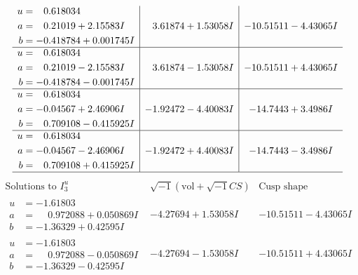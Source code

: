 \documentclass[1p]{elsarticle_modified}
\theoremstyle{definition}
\newcommand{\I}{\sqrt{-1}}
\begin{document}
$$\begin{array}{c|c|c}
\begin{aligned}
u &= \phantom{-}0.618034\phantom{ +0.000000I} \\
a &= \phantom{-}0.21019 + 2.15583 I \\
b &= -0.418784 + 0.001745 I\end{aligned}
 & \phantom{-}3.61874 + 1.53058 I & -10.51511 - 4.43065 I \\ \hline\begin{aligned}
u &= \phantom{-}0.618034\phantom{ +0.000000I} \\
a &= \phantom{-}0.21019 - 2.15583 I \\
b &= -0.418784 - 0.001745 I\end{aligned}
 & \phantom{-}3.61874 - 1.53058 I & -10.51511 + 4.43065 I \\ \hline\begin{aligned}
u &= \phantom{-}0.618034\phantom{ +0.000000I} \\
a &= -0.04567 + 2.46906 I \\
b &= \phantom{-}0.709108 - 0.415925 I\end{aligned}
 & -1.92472 - 4.40083 I & -14.7443 + 3.4986 I \\ \hline\begin{aligned}
u &= \phantom{-}0.618034\phantom{ +0.000000I} \\
a &= -0.04567 - 2.46906 I \\
b &= \phantom{-}0.709108 + 0.415925 I\end{aligned}
 & -1.92472 + 4.40083 I & -14.7443 - 3.4986 I\\
 \hline 
 \end{array}$$\newpage$$\begin{array}{c|c|c}  
\text{Solutions to }I^u_{3}& \I (\text{vol} + \sqrt{-1}CS) & \text{Cusp shape}\\
 \hline 
\begin{aligned}
u &= -1.61803\phantom{ +0.000000I} \\
a &= \phantom{-}0.972088 + 0.050869 I \\
b &= -1.36329 + 0.42595 I\end{aligned}
 & -4.27694 + 1.53058 I & -10.51511 - 4.43065 I \\ \hline\begin{aligned}
u &= -1.61803\phantom{ +0.000000I} \\
a &= \phantom{-}0.972088 - 0.050869 I \\
b &= -1.36329 - 0.42595 I\end{aligned}
 & -4.27694 - 1.53058 I & -10.51511 + 4.43065 I \\ \hline\begin{aligned}

\end{aligned}
\end{array}$$
\end{document}
